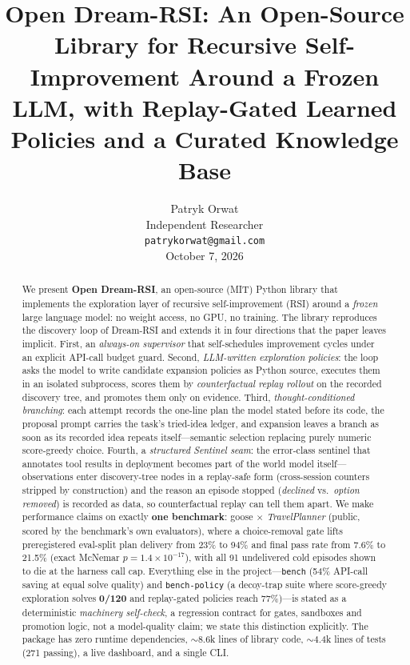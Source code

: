 \documentclass[11pt,a4paper]{article}
\title{\bfseries Open Dream-RSI: An Open-Source Library for Recursive
Self-Improvement Around a Frozen LLM, with Replay-Gated Learned Policies and a
Curated Knowledge Base}
\author{%
Patryk Orwat\\
Independent Researcher\\
\texttt{patrykorwat@gmail.com}\\[2pt]
\small October 7, 2026
}
\date{}
\begin{document}
\maketitle

\begin{abstract}
We present \textbf{Open Dream-RSI}, an open-source (MIT) Python library that
implements the exploration layer of recursive self-improvement (RSI) around a
\emph{frozen} large language model: no weight access, no GPU, no training. The
library reproduces the discovery loop of Dream-RSI \cite{dreamrsi} and extends
it in four directions that the paper leaves implicit. First, an
\emph{always-on supervisor} that self-schedules improvement cycles under an
explicit API-call budget guard. Second, \emph{LLM-written exploration
policies}: the loop asks the model to write candidate expansion policies as
Python source, executes them in an isolated subprocess, scores them by
\emph{counterfactual replay rollout} on the recorded discovery tree, and
promotes them only on evidence. Third,
\emph{thought-conditioned branching}: each attempt records the one-line plan
the model stated before its code, the proposal prompt carries the task's
tried-idea ledger, and expansion leaves a branch as soon as its recorded idea
repeats itself---semantic selection replacing purely numeric score-greedy
choice. Fourth, a \emph{structured Sentinel seam}: the error-class sentinel
that annotates tool results in deployment becomes part of the world model
itself---observations enter discovery-tree nodes in a replay-safe form
(cross-session counters stripped by construction) and the reason an episode
stopped (\emph{declined} vs.\ \emph{option removed}) is recorded as data, so
counterfactual replay can tell them apart.
We make performance claims on exactly \textbf{one benchmark}: goose
$\times$ \emph{TravelPlanner} (public, scored by the benchmark's own
evaluators), where a choice-removal gate lifts preregistered eval-split plan
delivery from 23\% to 94\% and final pass rate from 7.6\% to 21.5\%
(exact McNemar $p{=}1.4{\times}10^{-17}$), with all 91 undelivered cold
episodes shown to die at the harness call cap. Everything else in the
project---\texttt{bench} (54\% API-call saving at equal solve quality) and
\texttt{bench-policy} (a decoy-trap suite where score-greedy exploration
solves \textbf{0/120} and replay-gated policies reach 77\%)---is stated as a
deterministic \emph{machinery self-check}, a regression contract for gates,
sandboxes and promotion logic, not a model-quality claim; we state this
distinction explicitly. The package has zero runtime dependencies,
${\sim}8.6$k lines of library code, ${\sim}4.4$k lines of tests (271
passing), a live dashboard, and a single CLI.
\end{abstract}
\end{document}
